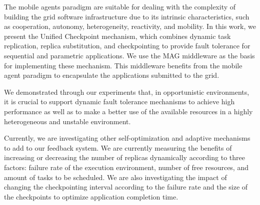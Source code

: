 \documentclass{sig-alternate}
\begin{document}
The mobile agents paradigm are suitable for dealing with the complexity
of building the grid software infrastructure due to its intrinsic
characteristics, such as cooperation, autonomy, heterogeneity, reactivity, and
mobility. In this work, we present the Unified Checkpoint
mechanism, which combines dynamic task replication, replica substitution, and
checkpointing to provide fault tolerance for sequential and parametric
applications. We use the MAG middleware as the basis for implementing these
mechanism. This middleware benefits from the mobile agent paradigm to
encapsulate the applications submitted to the grid. 

We demonstrated through our experiments that, in opportunistic environments,
it is crucial to support dynamic fault tolerance mechanisms to
achieve high performance as well as to make a better use of the available
resources in a highly heterogeneous and unstable environment.

Currently, we are investigating other self-optimization and adaptive mechanisms
to add to our feedback system. We are currently measuring the benefits of increasing
or decreasing the number of replicas dynamically according to three factors: failure rate
of the execution environment, number of free resources, and amount of tasks to
be scheduled. We are also investigating the impact of changing the
checkpointing interval according to the failure rate and the size of the
checkpoints to optimize application completion time. 



%
%
\balancecolumns
\end{document}
